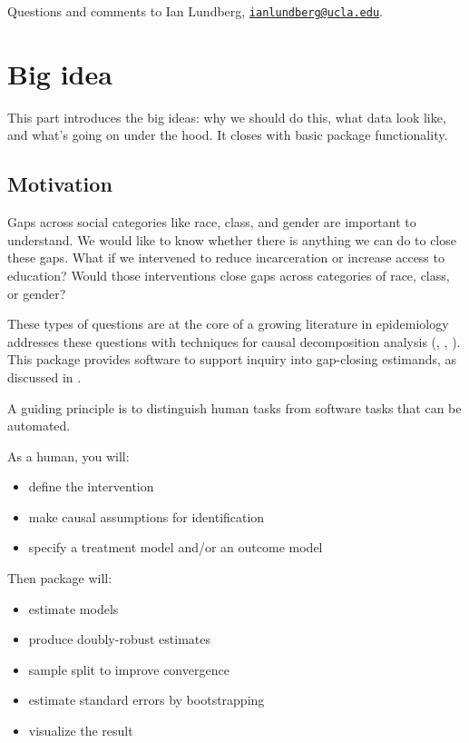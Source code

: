 \documentclass[
]{article}
\providecommand{\tightlist}{%
  \setlength{\itemsep}{0pt}\setlength{\parskip}{0pt}}
\begin{document}
Questions and comments to Ian Lundberg, \href{mailto:ianlundberg@ucla.edu}{\nolinkurl{ianlundberg@ucla.edu}}.

\section{Big idea}\label{big-idea}

This part introduces the big ideas: why we should do this, what data look like, and what's going on under the hood. It closes with basic package functionality.

\subsection{Motivation}\label{motivation}

Gaps across social categories like race, class, and gender are important to understand. We would like to know whether there is anything we can do to close these gaps. What if we intervened to reduce incarceration or increase access to education? Would those interventions close gaps across categories of race, class, or gender?

These types of questions are at the core of a growing literature in epidemiology addresses these questions with techniques for causal decomposition analysis (\citet{vanderweele2014}, \citet{jackson2018}, \citet{jackson2020}). This package provides software to support inquiry into gap-closing estimands, as discussed in \citet{lundberg2021}.

A guiding principle is to distinguish human tasks from software tasks that can be automated.

As a human, you will:

\begin{itemize}
\tightlist
\item
  define the intervention
\item
  make causal assumptions for identification
\item
  specify a treatment model and/or an outcome model
\end{itemize}

Then package will:

\begin{itemize}
\tightlist
\item
  estimate models
\item
  produce doubly-robust estimates
\item
  sample split to improve convergence
\item
  estimate standard errors by bootstrapping
\item
  visualize the result
\end{itemize}
\end{document}
